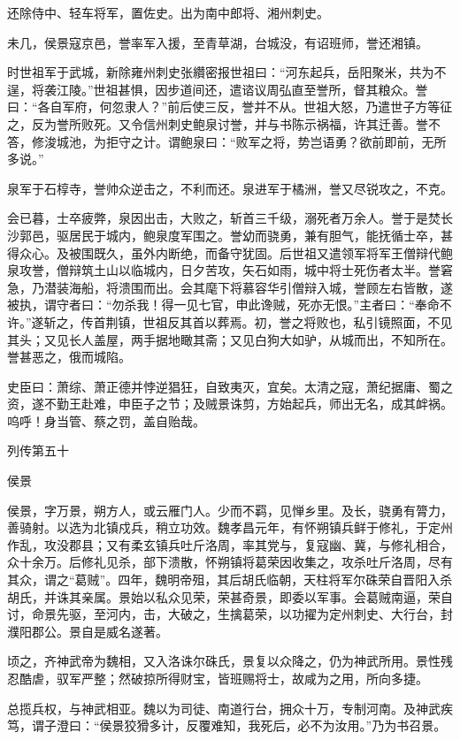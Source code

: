 \documentclass[12pt,UTF8]{ctexbook}
\begin{document}
还除侍中、轻车将军，置佐史。出为南中郎将、湘州刺史。

未几，侯景寇京邑，誉率军入援，至青草湖，台城没，有诏班师，誉还湘镇。

时世祖军于武城，新除雍州刺史张纘密报世祖曰：“河东起兵，岳阳聚米，共为不逞，将袭江陵。”世祖甚惧，因步道间还，遣谘议周弘直至誉所，督其粮众。誉曰：“各自军府，何忽隶人？”前后使三反，誉并不从。世祖大怒，乃遣世子方等征之，反为誉所败死。又令信州刺史鲍泉讨誉，并与书陈示祸福，许其迁善。誉不答，修浚城池，为拒守之计。谓鲍泉曰：“败军之将，势岂语勇？欲前即前，无所多说。”

泉军于石椁寺，誉帅众逆击之，不利而还。泉进军于橘洲，誉又尽锐攻之，不克。

会已暮，士卒疲弊，泉因出击，大败之，斩首三千级，溺死者万余人。誉于是焚长沙郭邑，驱居民于城内，鲍泉度军围之。誉幼而骁勇，兼有胆气，能抚循士卒，甚得众心。及被围既久，虽外内断绝，而备守犹固。后世祖又遣领军将军王僧辩代鲍泉攻誉，僧辩筑土山以临城内，日夕苦攻，矢石如雨，城中将士死伤者太半。誉窘急，乃潜装海船，将溃围而出。会其麾下将慕容华引僧辩入城，誉顾左右皆散，遂被执，谓守者曰：“勿杀我！得一见七官，申此谗贼，死亦无恨。”主者曰：“奉命不许。”遂斩之，传首荆镇，世祖反其首以葬焉。初，誉之将败也，私引镜照面，不见其头；又见长人盖屋，两手据地瞰其斋；又见白狗大如驴，从城而出，不知所在。誉甚恶之，俄而城陷。

史臣曰：萧综、萧正德并悖逆猖狂，自致夷灭，宜矣。太清之寇，萧纪据庸、蜀之资，遂不勤王赴难，申臣子之节；及贼景诛剪，方始起兵，师出无名，成其衅祸。呜呼！身当管、蔡之罚，盖自贻哉。





列传第五十

侯景

侯景，字万景，朔方人，或云雁门人。少而不羁，见惮乡里。及长，骁勇有膂力，善骑射。以选为北镇戍兵，稍立功效。魏孝昌元年，有怀朔镇兵鲜于修礼，于定州作乱，攻没郡县；又有柔玄镇兵吐斤洛周，率其党与，复寇幽、冀，与修礼相合，众十余万。后修礼见杀，部下溃散，怀朔镇将葛荣因收集之，攻杀吐斤洛周，尽有其众，谓之“葛贼”。四年，魏明帝殂，其后胡氏临朝，天柱将军尔硃荣自晋阳入杀胡氏，并诛其亲属。景始以私众见荣，荣甚奇景，即委以军事。会葛贼南逼，荣自讨，命景先驱，至河内，击，大破之，生擒葛荣，以功擢为定州刺史、大行台，封濮阳郡公。景自是威名遂著。

顷之，齐神武帝为魏相，又入洛诛尔硃氏，景复以众降之，仍为神武所用。景性残忍酷虐，驭军严整；然破掠所得财宝，皆班赐将士，故咸为之用，所向多捷。

总揽兵权，与神武相亚。魏以为司徒、南道行台，拥众十万，专制河南。及神武疾笃，谓子澄曰：“侯景狡猾多计，反覆难知，我死后，必不为汝用。”乃为书召景。
\end{document}
